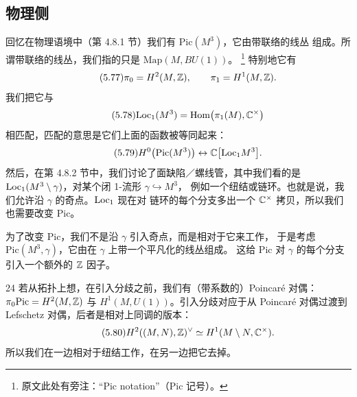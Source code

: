\subsection{物理侧}
\label{sec:5-3-1}

回忆在物理语境中（第 4.8.1 节）我们有 $\mathrm{Pic}(M^{3})$，它由带联络的线丛
组成。所谓带联络的线丛，我们指的只是 $\mathrm{Map}(M,BU(1))$。
\footnote{原文此处有旁注：“Pic notation”（$\mathrm{Pic}$ 记号）。}
特别地它有
\begin{equation}\tag{5.77}
\pi_{0}=H^{2}(M,\mathbb{Z}),\qquad \pi_{1}=H^{1}(M,\mathbb{Z}).
\end{equation}
我们把它与
\begin{equation}\tag{5.78}
\mathrm{Loc}_{1}(M^{3})=\mathrm{Hom}\bigl(\pi_{1}(M),\mathbb{C}^{\times}\bigr)
\end{equation}
相匹配，匹配的意思是它们上面的函数被等同起来：
\begin{equation}\tag{5.79}
H^{0}\bigl(\mathrm{Pic}(M^{3})\bigr)\leftrightarrow\mathbb{C}\bigl[\mathrm{Loc}_{1}M^{3}\bigr].
\end{equation}
然后，在第 4.8.2 节中，我们讨论了面缺陷／螺线管，其中我们看的是
$\mathrm{Loc}_{1}(M^{3}\setminus\gamma)$，对某个闭 1-流形 $\gamma\hookrightarrow M^{3}$，
例如一个纽结或链环。也就是说，我们允许沿 $\gamma$ 的奇点。$\mathrm{Loc}_{1}$ 现在对
链环的每个分支多出一个 $\mathbb{C}^{\times}$ 拷贝，所以我们也需要改变 $\mathrm{Pic}$。

为了改变 $\mathrm{Pic}$，我们不是沿 $\gamma$ 引入奇点，而是相对于它来工作，
于是考虑 $\mathrm{Pic}(M^{3},\gamma)$，它由在 $\gamma$ 上带一个平凡化的线丛组成。
这给 $\mathrm{Pic}$ 对 $\gamma$ 的每个分支引入一个额外的 $\mathbb{Z}$ 因子。

\begin{srcrem}{24}
若从拓扑上想，在引入分歧之前，我们有（带系数的）Poincaré 对偶：
$\pi_{0}\mathrm{Pic}=H^{2}(M,\mathbb{Z})$ 与 $H^{1}(M,U(1))$。引入分歧对应于从
Poincaré 对偶过渡到 Lefschetz 对偶，后者是相对上同调的版本：
\begin{equation}\tag{5.80}
H^{2}((M,N),\mathbb{Z})^{\vee}\simeq H^{1}(M\setminus N,\mathbb{C}^{\times}).
\end{equation}
所以我们在一边相对于纽结工作，在另一边把它去掉。
\end{srcrem}



